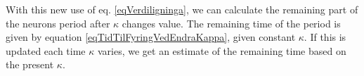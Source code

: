 With this new use of eq. \eqref{eqVerdiligninga}, we can calculate the remaining part of the neurons period after $\kappa$ changes value. 
The remaining time of the period is given by equation \eqref{eqTidTilFyringVedEndraKappa}, given constant $\kappa$. 
If this is updated each time $\kappa$ varies, we get an estimate of the remaining time based on the present $\kappa$.























